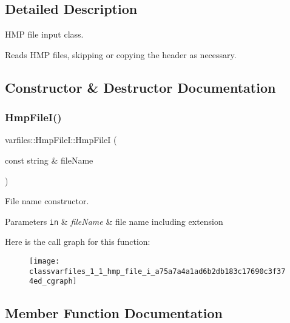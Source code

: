 \subsection{Detailed Description}
H\+MP file input class. 

Reads H\+MP files, skipping or copying the header as necessary. 

\subsection{Constructor \& Destructor Documentation}
\mbox{\label{classvarfiles_1_1_hmp_file_i_a75a7a4a1ad6b2db183c17690c3f374ed}} 
\subsubsection{\texorpdfstring{Hmp\+File\+I()}{HmpFileI()}}
{\footnotesize\ttfamily varfiles\+::\+Hmp\+File\+I\+::\+Hmp\+FileI (\begin{DoxyParamCaption}\item[{const string \&}]{file\+Name }\end{DoxyParamCaption})\hspace{0.3cm}{\ttfamily [inline]}}



File name constructor. 


\begin{DoxyParams}[1]{Parameters}
\mbox{\tt in}  & {\em file\+Name} & file name including extension \\
\hline
\end{DoxyParams}
Here is the call graph for this function\+:\nopagebreak
\begin{figure}[H]
\begin{center}
\leavevmode
\texttt{[image: classvarfiles\_1\_1\_hmp\_file\_i\_a75a7a4a1ad6b2db183c17690c3f374ed\_cgraph]}
\end{center}
\end{figure}


\subsection{Member Function Documentation}
\mbox{\label{classvarfiles_1_1_hmp_file_i_afd02563de7ecb89a94e8af4110676710}} 
